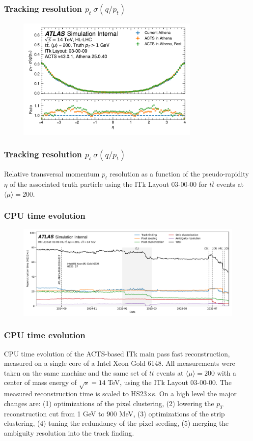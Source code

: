 \documentclass[aspectratio=169]{beamer}
\begin{document}
\begin{frame}
\frametitle{Tracking resolution $p_t \ \sigma(q/p_t)$}
\begin{figure}[h]
    \centering
    \includegraphics[width=0.8\textwidth]{plots/tracking_resolution_ptqopt.pdf}
\end{figure}
\end{frame}

\begin{frame}
\frametitle{Tracking resolution $p_t \ \sigma(q/p_t)$}
Relative transversal momentum $p_t$ resolution as a function of the pseudo-rapidity $\eta$ of the associated truth particle using the ITk Layout 03-00-00 for $t\bar{t}$ events at $\langle \mu \rangle = 200$.
\end{frame}

\begin{frame}
\frametitle{CPU time evolution}
\begin{figure}[h]
    \centering
    \includegraphics[width=1.0\textwidth]{plots/spot.pdf}
\end{figure}
\end{frame}

\begin{frame}
\frametitle{CPU time evolution}
CPU time evolution of the ACTS-based ITk main pass fast reconstruction, measured on a single core of a Intel Xeon Gold 6148. All measurements were taken on the same machine and the same set of $t\bar{t}$ events at $\langle \mu \rangle = 200$ with a center of mass energy of $\sqrt{s}=14$ TeV, using the ITk Layout 03-00-00. The measured reconstruction time is scaled to HS23$\times$s. On a high level the major changes are: (1) optimizations of the pixel clustering, (2) lowering the $p_T$ reconstruction cut from 1 GeV to 900 MeV, (3) optimizations of the strip clustering, (4) tuning the redundancy of the pixel seeding, (5) merging the ambiguity resolution into the track finding.
\end{frame}
\end{document}
